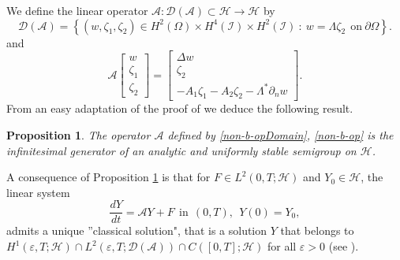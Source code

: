\documentclass[a4paper, 12pt]{article}
\theoremstyle{plain}
\newtheorem{proposition}[theorem]{Proposition}
\theoremstyle{definition}
\numberwithin{theorem}{section}
\numberwithin{equation}{section}
\begin{document}
We define the linear operator $\mathcal{A}:\mathcal{D}(\mathcal{A})\subset \mathscr{H}\to \mathscr{H}$ by
\begin{equation}\label{non-b-opDomain}
\mathcal{D}(\mathcal{A})=\left\{(w,\zeta_1,\zeta_2)\in H^2(\Omega)\times H^4(\mathcal{I})\times H^2(\mathcal{I})~:~w=\Lambda \zeta_2~~\text{on}~\partial\Omega\right \}.
\end{equation}
and 
\begin{equation}\label{non-b-op}
\mathcal{A}\begin{bmatrix}
w\\
\zeta_1\\
\zeta_2
\end{bmatrix}=\begin{bmatrix}
  \Delta w\\
  \zeta_2\\
  -A_1\zeta_1-A_2\zeta_2-\Lambda^*\partial_nw
\end{bmatrix}.
\end{equation}
From an easy adaptation of the proof of \cite[Propositions 3.4, 3.5 and 3.11]{MT} we deduce the following result.
\begin{proposition}\label{PropAnalytiqueEtStable}
The operator $\mathcal{A}$ defined by \eqref{non-b-opDomain}, \eqref{non-b-op} is the infinitesimal generator of an analytic and uniformly stable semigroup on  $\mathscr{H}$.
\end{proposition}

A consequence of Proposition \ref{PropAnalytiqueEtStable} is that for $F\in L^2(0,T;\mathscr{H})$ and $Y_0\in \mathscr{H}$, the linear system 
\begin{equation} \label{eq_forwardprob_semigroupform0}
\frac{d Y}{dt}=\mathcal{A}Y+F~~\text{in}~~(0,T),~~Y(0)=Y_0,
\end{equation}
admits a unique ''classical solution", that is a solution $Y$ that belongs to $H^1(\varepsilon,T;\mathscr{H})\cap L^2(\varepsilon,T;\mathcal{D}(\mathcal{A}))\cap C([0,T];\mathscr{H})$ for all $\varepsilon>0$ (see \cite[Definition 3.1 p.129 and Proposition 3.8 p.145]{BDDM}). 
\end{document}
